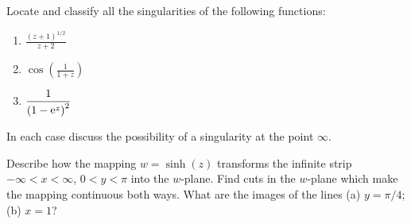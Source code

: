 {%
\begin{Exercise}
  \label{exercise classify z1z2}
  Locate and classify all the singularities of the following functions:
  \begin{enumerate}
  \item $\displaystyle \frac{(z+1)^{1/2}}{z+2}$
  \item $\displaystyle \cos \left( \frac{1}{1+z} \right)$
  \item $\displaystyle \frac{1}{\left( 1 - \mathop{\mathrm{e}}\nolimits^z \right)^2 }$
  \end{enumerate}
  In each case discuss the possibility of a singularity at the point $\infty$.

\end{Exercise}








\begin{Exercise}
  \label{exercise sinh 0 pi}
  Describe how the mapping $w = \sinh(z)$ transforms
  the infinite strip $-\infty < x < \infty$, $0 < y < \pi$ into the
  $w$-plane. Find cuts in the $w$-plane which make the mapping
  continuous both ways. What are the images of the lines (a) $y = \pi / 4$;
  (b) $x = 1$?

\end{Exercise}











\raggedbottom
}
